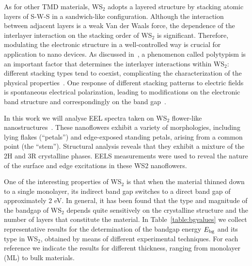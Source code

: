 As for other TMD materials, WS$_2$ adopts a layered structure 
by stacking atomic layers of S-W-S in a sandwich-like configuration. 
%
Although the interaction between adjacent layers is a weak Van der Waals 
force, the dependence of the interlayer interaction on the stacking 
order of WS$_2$ is significant.
%
Therefore, modulating the electronic
structure in a well-controlled way is crucial for application to
nano devices.
%
As discussed in~\cite{SabryaWS2},
a phenomenon called polytypism is an important factor that determines the interlayer
interactions within WS$_2$: different stacking types tend to coexist, 
complicating the characterization of the physical properties~\cite{Na:2018}.
%
One response of different stacking patterns to electric fields is
spontaneous electrical polarization, leading to modifications on the 
electronic band structure and correspondingly on the band gap~\cite{Li:2016}.

In this work we will analyse EEL spectra taken on WS$_2$ flower-like nanostructures~\cite{SabryaWS2}.
%
These nanoflowers  exhibit a  variety of morphologies, including lying flakes (“petals”) and
edge-exposed standing petals, arising from a common point (the “stem”).
%
 Structural analysis reveals that they exhibit a mixture of the 2H and 3R crystalline phases. 
%
EELS measurements were used to reveal the nature of the surface and edge excitations in these WS2 nanoflowers.

One of the interesting properties of  WS$_2$ is
that when the material
thinned down to a single monolayer, its indirect band gap switches to a direct band gap of approximately 2 eV.
%
In general, it has been found that the type and magnitude of the bandgap
of WS$_2$ depends quite sensitively on the crystalline structure and
the number of layers that constitute the material.
%
In Table~\ref{table:bgvalues} we collect
representative results for the determination of the bandgap energy $E_{\rm bg}$
and its type in WS$_2$, obtained by means of different experimental techniques.
%
For each reference we indicate the results for different thickness, ranging from monolayer (ML)
to bulk materials.

